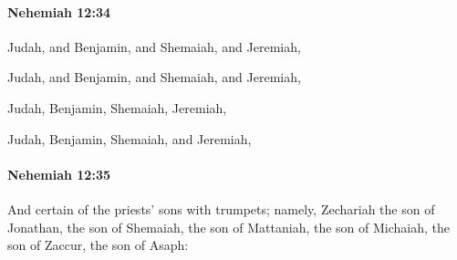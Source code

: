 		\paragraph{Nehemiah 12:34} %
			\label{NEHEMIAH-12-34}

			Judah, and Benjamin, and Shemaiah, and Jeremiah,

			\begin{versebox}
					\item[BHS] 
					\item[LXX] 
					\item[ASV] Judah, and Benjamin, and Shemaiah, and Jeremiah,
					\item[NIV] Judah, Benjamin, Shemaiah, Jeremiah,
					\item[NRSV] Judah, Benjamin, Shemaiah, and Jeremiah,
			\end{versebox}

		\paragraph{Nehemiah 12:35} %
			\label{NEHEMIAH-12-35}

			And certain of the priests’ sons with trumpets; namely, Zechariah the son of Jonathan, the son of Shemaiah, the son of Mattaniah, the son of Michaiah, the son of Zaccur, the son of Asaph:

